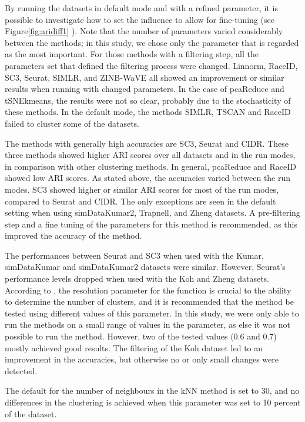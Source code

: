 \documentclass[12pt, a4paper]{article}\usepackage[]{graphicx}\usepackage[]{color}
\begin{document}
By running the datasets in default mode and with a refined parameter, it is possible to investigate how to set the influence to allow for fine-tuning (see Figure\ref{fig:aridiff1} ). Note that the number of parameters varied considerably between the methods; in this study, we chose only the parameter that is regarded as the most important. For those methods with a filtering step, all the parameters set that defined the filtering process were changed. Linnorm, RaceID, SC3, Seurat, SIMLR, and ZINB-WaVE all showed an improvement or similar results when running with changed parameters. In the case of pcaReduce and tSNEkmeans, the results were not so clear, probably due to the stochasticity of these methods. In the default mode, the methods SIMLR, TSCAN and RaceID failed to cluster some of the datasets. 


The methods with generally high accuracies are SC3, Seurat and CIDR. These three methods showed higher ARI scores over all datasets and in the run modes, in comparison with other clustering methods. In general, pcaReduce and RaceID showed low ARI scores. As stated above, the accuracies varied between the run modes.
SC3 showed higher or similar ARI scores for most of the run modes, compared to Seurat and CIDR. The only exceptions are seen in the default setting when using simDataKumar2, Trapnell, and Zheng datasets. A pre-filtering step and a fine tuning of the parameters for this method is recommended, as this improved the accuracy of the method. 

The performances between Seurat and SC3 when used with the Kumar, simDataKumar and simDataKumar2 datasets were similar. However, Seurat’s performance levels dropped when used with the Koh and Zheng datasets. According to \citep{butler2017integrated}, the resolution parameter  for the function is crucial to the ability to determine the number of clusters, and it is recommended that the method be tested using different values of this parameter. In this study, we were only able to run the methods on a small range of values in the parameter, as else it was not possible to run the method. However, two of the tested values (0.6 and 0.7) mostly achieved good results. The filtering of the Koh dataset led to an improvement in the accuracies, but otherwise no or only small changes were detected.  
 
The default for the number of neighbours in the kNN method is set to 30, and no differences in the clustering is achieved when this parameter was set to 10 percent of the dataset. 
\end{document}
